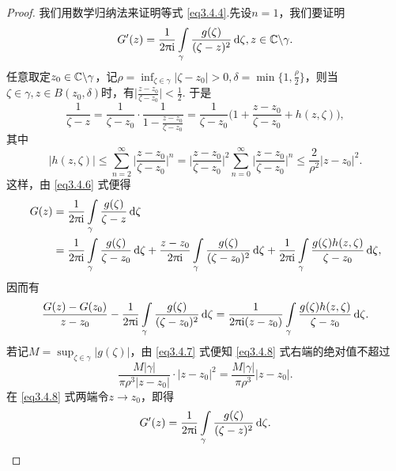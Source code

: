 \begin{proof}
  我们用数学归纳法来证明等式 \eqref{eq3.4.4}.先设$n=1$，我们要证明
  \begin{equation}\label{eq3.4.5}
    G'(z) = \frac1{2\uppi\mathrm i}\int\limits_\gamma \frac{g(\zeta)}{(\zeta-z)^2}\mathop{}\!\mathrm{d} \zeta,z\in\mathbb C\backslash\gamma.
  \end{equation}
  任意取定$z_0\in\mathbb C\backslash\gamma$，记$\rho=\inf_{\zeta\in\gamma}|\zeta-z_0|>0,\delta=\min\bigg\{1,\frac\rho2\bigg\}$，则当$\zeta\in\gamma,z\in B(z_0,\delta)$时，有$\bigg|\frac{z-z_0}{\zeta-z_0}\bigg|<\frac12$. 于是
  \begin{equation}\label{eq3.4.6}
    \frac1{\zeta-z} = \frac1{\zeta-z_0}\cdot\frac1{1-\frac{z-z_0}{\zeta-z_0}}
    = \frac1{\zeta-z_0}\bigg(1+\frac{z-z_0}{\zeta-z_0}+h(z,\zeta)\bigg),
  \end{equation}
  其中
  \begin{equation}\label{eq3.4.7}
    |h(z,\zeta)|\le\sum_{n=2}^\infty\bigg| \frac{z-z_0}{\zeta-z_0}\bigg|^n
    = \bigg|\frac{z-z_0}{\zeta-z_0}\bigg|^2\sum_{n=0}^\infty \bigg|\frac{z-z_0}{\zeta-z_0}\bigg|^n
    \le \frac2{\rho^2}|z-z_0|^2.
  \end{equation}
  这样，由 \eqref{eq3.4.6} 式便得
  \begin{align*}
    G(z) & = \frac1{2\uppi\mathrm i}\int\limits_\gamma\frac{g(\zeta)}{\zeta-z}\mathop{}\!\mathrm{d} \zeta\\
    & = \frac1{2\uppi\mathrm i}\int\limits_\gamma\frac{g(\zeta)}{\zeta-z_0}\mathop{}\!\mathrm{d} \zeta + \frac{z-z_0}{2\uppi\mathrm i}\int\limits_\gamma\frac{g(\zeta)}{(\zeta-z_0)^2}\mathop{}\!\mathrm{d} \zeta
    + \frac1{2\uppi\mathrm i}\int\limits_\gamma\frac{g(\zeta)h(z,\zeta)}{\zeta-z_0}\mathop{}\!\mathrm{d} \zeta,
  \end{align*}
  因而有
  \begin{equation}\label{eq3.4.8}
    \frac{G(z)-G(z_0)}{z-z_0} - \frac1{2\uppi\mathrm i}\int\limits_\gamma\frac{g(\zeta)}{(\zeta-z_0)^2}\mathop{}\!\mathrm{d} \zeta = \frac1{2\uppi\mathrm i(z-z_0)}\int\limits_\gamma\frac{g(\zeta)h(z,\zeta)}{\zeta-z_0}\mathop{}\!\mathrm{d} \zeta.
  \end{equation}
  若记$M=\sup_{\zeta\in\gamma}|g(\zeta)|$，由 \eqref{eq3.4.7} 式便知 \eqref{eq3.4.8} 式右端的绝对值不超过
  \[
    \frac{M|\gamma|}{\pi\rho^3|z-z_0|}\cdot|z-z_0|^2 = \frac{M|\gamma|}{\pi\rho^3}|z-z_0|.
  \]
  在 \eqref{eq3.4.8} 式两端令$z\to z_0$，即得
  \[
    G'(z) = \frac1{2\uppi\mathrm i}\int\limits_\gamma\frac{g(\zeta)}{(\zeta-z)^2}\mathop{}\!\mathrm{d} \zeta.
  \]


\end{proof}
